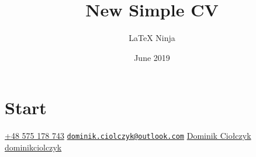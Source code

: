 \documentclass[darkhipster]{simplehipstercv}
\title{New Simple CV}
\author{\LaTeX{} Ninja}
\date{June 2019}
\begin{document}
\thispagestyle{empty}

\section*{Start}


\vspace*{1.5cm}

\begin{center}\small
      \textcolor{white}{\href{tel:+48575178743}{+48 575 178 743}} \quad
         \textcolor{white}{\href{mailto:dominik.ciolczyk@outlook.com}{\texttt{dominik.ciolczyk@outlook.com}}} \quad
    \textcolor{white}{\href{https://www.linkedin.com/in/dominik-ciolczyk/}{Dominik Ciołczyk}} \quad
      \textcolor{white}{\href{https://github.com/dominikciolczyk}{dominikciolczyk}}
\end{center}

\vspace*{-3.5em} %


\subsection*{}
\end{document}
